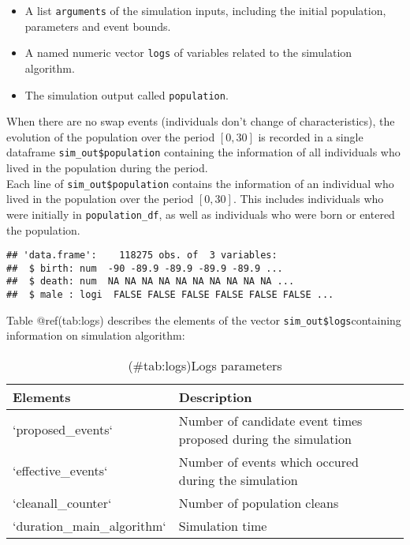 \begin{itemize}
\tightlist
\item
  A list \texttt{arguments} of the simulation inputs, including the initial population, parameters and event bounds.
\item
  A named numeric vector \texttt{logs} of variables related to the simulation algorithm.
\item
  The simulation output called \texttt{population}.
\end{itemize}

When there are no swap events (individuals don't change of characteristics), the evolution of the population over the period \([0,30]\) is recorded in a single dataframe \texttt{sim\_out\$population} containing the information of all individuals who lived in the population during the period.\\
Each line of \texttt{sim\_out\$population} contains the information of an individual who lived in the population over the period \([0,30]\). This includes individuals who were initially in \texttt{population\_df}, as well as individuals who were born or entered the population.

\begin{Shaded}
\begin{Highlighting}[]
\OperatorTok{$}
\end{Highlighting}
\end{Shaded}

\begin{verbatim}
## 'data.frame':    118275 obs. of  3 variables:
##  $ birth: num  -90 -89.9 -89.9 -89.9 -89.9 ...
##  $ death: num  NA NA NA NA NA NA NA NA NA NA ...
##  $ male : logi  FALSE FALSE FALSE FALSE FALSE FALSE ...
\end{verbatim}

Table @ref(tab:logs) describes the elements of the vector \texttt{sim\_out\$logs}containing information on simulation algorithm:

\begin{table}

\caption{(\#tab:logs)Logs parameters}
\centering
\begin{tabular}[t]{l|l}
\hline
Elements & Description\\
\hline
`proposed\_events` & Number of candidate event times proposed during the simulation\\
\hline
`effective\_events` & Number of events which occured during the simulation\\
\hline
`cleanall\_counter` & Number of population cleans\\
\hline
`duration\_main\_algorithm` & Simulation time\\
\hline
\end{tabular}
\end{table}

